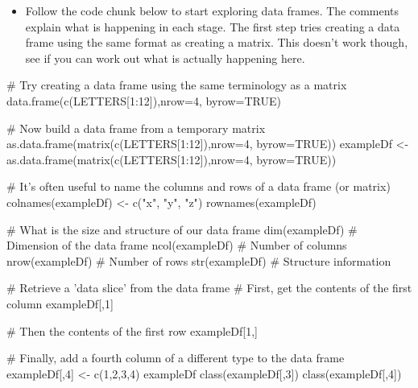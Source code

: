 \documentclass[a4paper]{book}
\newenvironment{Shaded}{}{}
\newcommand{\KeywordTok}[1]{\textcolor[rgb]{0.00,0.00,1.00}{{#1}}}
\newcommand{\DataTypeTok}[1]{{#1}}
\newcommand{\DecValTok}[1]{{#1}}
\newcommand{\StringTok}[1]{\textcolor[rgb]{0.00,0.50,0.50}{{#1}}}
\newcommand{\CommentTok}[1]{\textcolor[rgb]{0.00,0.50,0.00}{{#1}}}
\newcommand{\OtherTok}[1]{\textcolor[rgb]{1.00,0.25,0.00}{{#1}}}
\newcommand{\NormalTok}[1]{{#1}}
\newlength{\leftbarwidth}
\newlength{\leftbarsep}
\newcommand*{\leftbarcolorcmd}{\color{darkgray}}%
\renewenvironment{leftbar}{%
    \def\FrameCommand{{\leftbarcolorcmd{\vrule width \leftbarwidth\relax\hspace {\leftbarsep}}}}%
    \MakeFramed {\advance \hsize -\width \FrameRestore }%
}{%
    \endMakeFramed
}
\renewenvironment{Shaded}
{\vspace{0em}\begin{leftbar}\begin{snugshade}}
{\end{snugshade}\end{leftbar}\vspace{0pt}}
\newenvironment{rmdblock}[1]
  {\vspace{1.5em}\begin{shaded*}
  \begin{itemize}
  \renewcommand{\labelitemi}{
    \raisebox{-.7\height}[0pt][0pt]{
      {\setkeys{Gin}{width=3em,keepaspectratio}\texttt{[image: images/\#1]}}
    }
  }
  \item
  }
  {
  \end{itemize}
  \end{shaded*}
  }
\newenvironment{rmdexercise}
  {\begin{rmdblock}{exercise}}
  {\end{rmdblock}}
\begin{document}
\begin{rmdexercise}
Follow the code chunk below to start exploring data frames. The comments
explain what is happening in each stage. The first step tries creating a
data frame using the same format as creating a matrix. This doesn't work
though, see if you can work out what is actually happening here.
\end{rmdexercise}

\begin{Shaded}
\begin{Highlighting}[]
\CommentTok{# Try creating a data frame using the same terminology as a matrix}
\KeywordTok{data.frame}\NormalTok{(}\KeywordTok{c}\NormalTok{(LETTERS[}\DecValTok{1}\NormalTok{:}\DecValTok{12}\NormalTok{]),}\DataTypeTok{nrow=}\DecValTok{4}\NormalTok{, }\DataTypeTok{byrow=}\OtherTok{TRUE}\NormalTok{)}

\CommentTok{# Now build a data frame from a temporary matrix}
\KeywordTok{as.data.frame}\NormalTok{(}\KeywordTok{matrix}\NormalTok{(}\KeywordTok{c}\NormalTok{(LETTERS[}\DecValTok{1}\NormalTok{:}\DecValTok{12}\NormalTok{]),}\DataTypeTok{nrow=}\DecValTok{4}\NormalTok{, }\DataTypeTok{byrow=}\OtherTok{TRUE}\NormalTok{))}
\NormalTok{exampleDf <-}\StringTok{ }\KeywordTok{as.data.frame}\NormalTok{(}\KeywordTok{matrix}\NormalTok{(}\KeywordTok{c}\NormalTok{(LETTERS[}\DecValTok{1}\NormalTok{:}\DecValTok{12}\NormalTok{]),}\DataTypeTok{nrow=}\DecValTok{4}\NormalTok{, }\DataTypeTok{byrow=}\OtherTok{TRUE}\NormalTok{))}

\CommentTok{# It's often useful to name the columns and rows of a data frame (or matrix)}
\KeywordTok{colnames}\NormalTok{(exampleDf) <-}\StringTok{ }\KeywordTok{c}\NormalTok{(}\StringTok{"x"}\NormalTok{, }\StringTok{"y"}\NormalTok{, }\StringTok{"z"}\NormalTok{)}
\KeywordTok{rownames}\NormalTok{(exampleDf)}

\CommentTok{# What is the size and structure of our data frame}
\KeywordTok{dim}\NormalTok{(exampleDf) }\CommentTok{# Dimension of the data frame}
\KeywordTok{ncol}\NormalTok{(exampleDf) }\CommentTok{# Number of columns}
\KeywordTok{nrow}\NormalTok{(exampleDf) }\CommentTok{# Number of rows}
\KeywordTok{str}\NormalTok{(exampleDf) }\CommentTok{# Structure information}

\CommentTok{# Retrieve a 'data slice' from the data frame}
\CommentTok{# First, get the contents of the first column}
\NormalTok{exampleDf[,}\DecValTok{1}\NormalTok{]}

\CommentTok{# Then the contents of the first row}
\NormalTok{exampleDf[}\DecValTok{1}\NormalTok{,]}

\CommentTok{# Finally, add a fourth column of a different type to the data frame}
\NormalTok{exampleDf[,}\DecValTok{4}\NormalTok{] <-}\StringTok{ }\KeywordTok{c}\NormalTok{(}\DecValTok{1}\NormalTok{,}\DecValTok{2}\NormalTok{,}\DecValTok{3}\NormalTok{,}\DecValTok{4}\NormalTok{)}
\NormalTok{exampleDf}
\KeywordTok{class}\NormalTok{(exampleDf[,}\DecValTok{3}\NormalTok{])}
\KeywordTok{class}\NormalTok{(exampleDf[,}\DecValTok{4}\NormalTok{])}
\end{Highlighting}
\end{Shaded}
\end{document}
